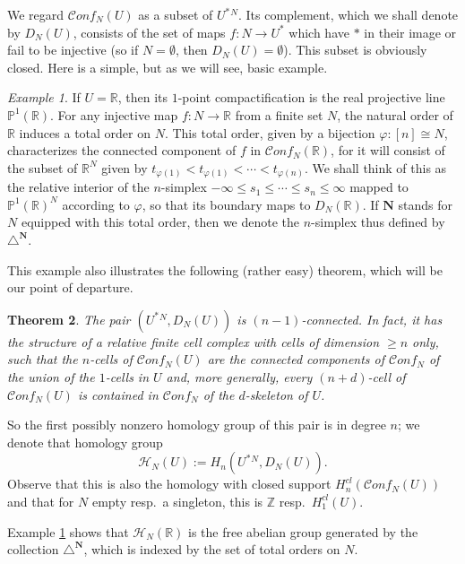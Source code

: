 \documentclass[12pt,letterpaper]{amsart}
\numberwithin{equation}{section}
\def\Nbold{{\mathbf N}}
\def\PP{{\mathbb P}}
\def\RR{{\mathbb R}}
\def\ZZ{{\mathbb Z}}
\def\tri{\triangle}
\def\Hcal{{\mathcal H}}
\newcommand\conf{\mathscr{C}\!\mathit{onf}\!}
\newtheorem{theorem}{Theorem}[section]
\theoremstyle{remark}
\newtheorem{example}[theorem]{Example}
\begin{document}
We regard $\conf_N(U)$ as a subset of  $U^*{}^N$. Its  complement, which we  shall denote by $D_N(U)$,  consists of the set of maps $f: N\to U^*$  which have  $*$  in their image  or fail to be injective (so  if  $N=\emptyset$, then  $D_N(U)=\emptyset$).  This subset  is obviously closed. Here is a  simple, but as we will see,  basic example.

\begin{example}\label{example:basic}
If $U=\RR$, then its $1$-point compactification is the real projective line $\PP^1(\RR)$. For any  injective map 
$f: N\to \RR$ from a finite set $N$,  the natural order of $\RR$ induces a total order on $N$. This total order, given by a bijection $\varphi: [n]\cong N$, characterizes the connected component of  $f$ in $\conf_N(\RR)$, for it will consist of the subset of  $\RR^N$ given by
$t_{\varphi(1)}<t_{\varphi(1)}<\cdots <t_{\varphi(n)}$. We shall think of this as the relative interior of the $n$-simplex $-\infty \le  s_1\le \cdots\le s_n\le \infty$ mapped to  $\PP^1(\RR)^N$ according to $\varphi$, so that  its boundary maps to $D_N(\RR)$. If $\Nbold$ stands for $N$ equipped with this total order, then we denote the $n$-simplex thus defined by $\tri^\Nbold$.
\end{example}

This example also illustrates the  following (rather easy) theorem, which will  be our point of departure.

\begin{theorem}\label{thm:connectedness}
The pair $(U^*{}^N, D_N(U))$ is $(n-1)$-connected. In fact, it has the structure of a relative finite cell  complex with cells of dimension $\ge n$ only,  such that 
the  $n$-cells of $\conf_N(U)$  are the connected components of $\conf_N$ of the union of the $1$-cells in  $U$ and, more generally,
every $(n+d)$-cell of $\conf_N(U)$ is contained in $\conf_N$ of the  $d$-skeleton of $U$.
\end{theorem}

So  the first possibly nonzero homology group of  this pair is in degree $n$; we denote that homology group 
\[
\Hcal_N(U):= H_n(U^*{}^N, D_N(U)).
\]
Observe that this is also the homology with closed support $H_n^{cl}(\conf_N(U))$ and that for $N$ empty resp.\ a singleton, this is $\ZZ$ resp.\ $H_1^{cl}(U)$.  

Example \ref{example:basic} shows that $\Hcal_N(\RR)$ is the free abelian group generated by the collection $\tri^\Nbold$,  which is indexed by the  set of total orders on $N$.
 \smallskip 
\end{document}
